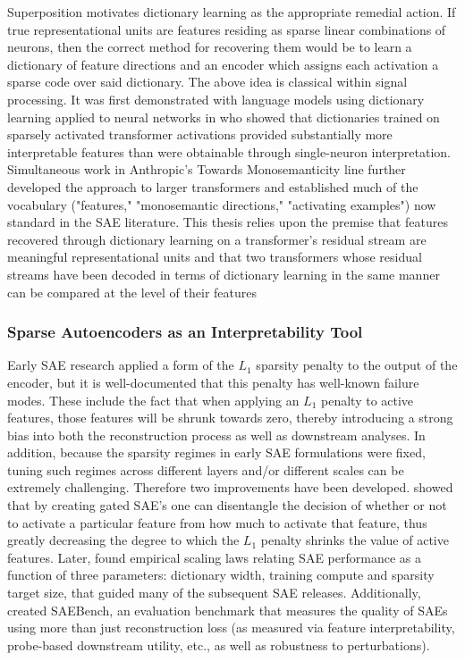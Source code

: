 Superposition motivates dictionary learning as the appropriate remedial action. If true representational units are features residing as sparse linear combinations of neurons, then the correct method for recovering them would be to learn a dictionary of feature directions and an encoder which assigns each activation a sparse code over said dictionary. The above idea is classical within signal processing. It was first demonstrated with language models using dictionary learning applied to neural networks in \textcite{cunningham_sparse_2023} who showed that dictionaries trained on sparsely activated transformer activations provided substantially more interpretable features than were obtainable through single-neuron interpretation. Simultaneous work in Anthropic's Towards Monosemanticity line \parencite{bricken_monosemanticity_2023} further developed the approach to larger transformers and established much of the vocabulary ("features," "monosemantic directions," "activating examples") now standard in the SAE literature. This thesis relies upon the premise that features recovered through dictionary learning on a transformer's residual stream are meaningful representational units and that two transformers whose residual streams have been decoded in terms of dictionary learning in the same manner can be compared at the level of their features

\subsubsection{Sparse Autoencoders as an Interpretability Tool}
\label{subsubsec:saes-tool}

Early SAE research applied a form of the $L_1$ sparsity penalty to the output of the encoder, but it is well-documented that this penalty has well-known failure modes. These include the fact that when applying an $L_1$ penalty to active features, those features will be shrunk towards zero, thereby introducing a strong bias into both the reconstruction process as well as downstream analyses. In addition, because the sparsity regimes in early SAE formulations were fixed, tuning such regimes across different layers and/or different scales can be extremely challenging. Therefore two improvements have been developed. 
\textcite{rajamanoharan_improving_2024} showed that by creating gated SAE's one can disentangle the decision of whether or not to activate a particular feature from how much to activate that feature, thus greatly decreasing the degree to which the $L_1$ penalty shrinks the value of active features. Later, \textcite{gao_scaling_2024} found empirical scaling laws relating SAE performance as a function of three parameters: dictionary width, training compute and sparsity target size, that guided many of the subsequent SAE releases.
Additionally, \textcite{karvonen_saebench_2025} created SAEBench, an evaluation benchmark that measures the quality of SAEs using more than just reconstruction loss (as measured via feature interpretability, probe-based downstream utility, etc., as well as robustness to perturbations).

